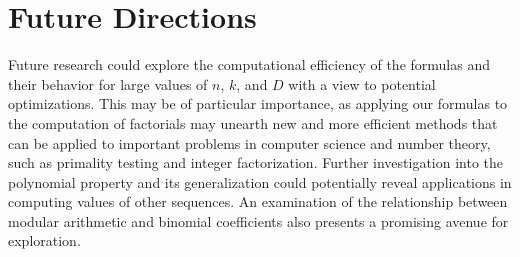 \documentclass{article}
\theoremstyle{plain}
\begin{document}
\section{Future Directions}
Future research could explore the computational efficiency of the formulas and their behavior for large values of \(n\), \(k\), and \(D\) with a view to potential optimizations. This may be of particular importance, as applying our formulas to the computation of factorials may unearth new and more efficient methods that can be applied to important problems in computer science and number theory, such as primality testing and integer factorization. Further investigation into the polynomial property and its generalization could potentially reveal applications in computing values of other sequences. An examination of the relationship between modular arithmetic and binomial coefficients also presents a promising avenue for exploration.



\end{document}
